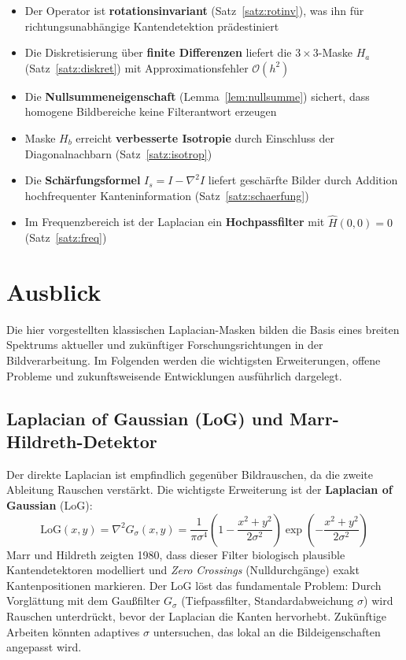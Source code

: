 ﻿\documentclass[a4paper,12pt]{article}
\theoremstyle{definition}
\begin{document}
\begin{itemize}
    \item Der Operator ist \textbf{rotationsinvariant} (Satz~\ref{satz:rotinv}), was ihn für
          richtungsunabhängige Kantendetektion prädestiniert
    \item Die Diskretisierung über \textbf{finite Differenzen} liefert die $3\times3$-Maske $H_a$
          (Satz~\ref{satz:diskret}) mit Approximationsfehler $\mathcal{O}(h^2)$
    \item Die \textbf{Nullsummeneigenschaft} (Lemma~\ref{lem:nullsumme}) sichert, dass homogene
          Bildbereiche keine Filterantwort erzeugen
    \item Maske $H_b$ erreicht \textbf{verbesserte Isotropie} durch Einschluss der
          Diagonalnachbarn (Satz~\ref{satz:isotrop})
    \item Die \textbf{Schärfungsformel} $I_s = I - \nabla^2 I$ liefert geschärfte Bilder durch
          Addition hochfrequenter Kanteninformation (Satz~\ref{satz:schaerfung})
    \item Im Frequenzbereich ist der Laplacian ein \textbf{Hochpassfilter} mit
          $\hat{H}(0,0) = 0$ (Satz~\ref{satz:freq})
\end{itemize}

\section{Ausblick}

Die hier vorgestellten klassischen Laplacian-Masken bilden die Basis eines breiten Spektrums
aktueller und zukünftiger Forschungsrichtungen in der Bildverarbeitung. Im Folgenden werden
die wichtigsten Erweiterungen, offene Probleme und zukunftsweisende Entwicklungen ausführlich
dargelegt.

\subsection{Laplacian of Gaussian (LoG) und Marr-Hildreth-Detektor}

Der direkte Laplacian ist empfindlich gegenüber Bildrauschen, da die zweite Ableitung Rauschen
verstärkt. Die wichtigste Erweiterung ist der \textbf{Laplacian of Gaussian} (LoG):
\[
    \text{LoG}(x,y) = \nabla^2 G_\sigma(x,y)
    = \frac{1}{\pi \sigma^4}\left(1 - \frac{x^2+y^2}{2\sigma^2}\right)
      \exp\!\left(-\frac{x^2+y^2}{2\sigma^2}\right)
\]
Marr und Hildreth \cite{marr1980} zeigten 1980, dass dieser Filter biologisch plausible Kantendetektoren
modelliert und \emph{Zero Crossings} (Nulldurchgänge) exakt Kantenpositionen markieren. Der LoG
löst das fundamentale Problem: Durch Vorglättung mit dem Gaußfilter $G_\sigma$ (Tiefpassfilter,
Standardabweichung $\sigma$) wird Rauschen unterdrückt, bevor der Laplacian die Kanten hervorhebt.
Zukünftige Arbeiten könnten adaptives $\sigma$ untersuchen, das lokal an die Bildeigenschaften
angepasst wird.
\end{document}

